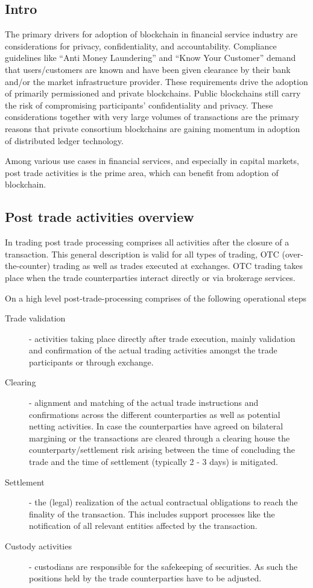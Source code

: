 \subsection{Intro}
The primary drivers for adoption of blockchain in financial service industry are considerations for privacy, confidentiality, and accountability. Compliance guidelines like “Anti Money Laundering” and “Know Your Customer” demand that users/customers are known and have been given clearance by their bank and/or the market infrastructure provider. These requirements drive the adoption of primarily permissioned and private blockchains. Public blockchains still carry the risk of compromising participants' confidentiality and privacy. These considerations together with very large volumes of transactions are the primary reasons that private consortium blockchains are gaining momentum in adoption of distributed ledger technology.

Among various use cases in financial services, and especially in capital markets, post trade activities is the prime area, which can benefit from adoption of blockchain.

\subsection{Post trade activities overview}
In trading post trade processing comprises all activities after the closure of a transaction. This general description is valid for all types of trading, OTC (over-the-counter) trading as well as trades executed at exchanges. OTC trading takes place when the trade counterparties interact directly or via brokerage services.

On a high level post-trade-processing comprises of the following operational steps
\begin{description}
\item [Trade validation] - activities taking place directly after trade execution, mainly validation and confirmation of the actual trading activities amongst the trade participants or through exchange. 
\item [Clearing] - alignment and  matching of the actual trade instructions and confirmations across the different counterparties as well as potential netting activities. In case the counterparties have agreed on bilateral margining or the transactions are cleared through a clearing house the counterparty/settlement risk arising between the time of concluding the trade and the time of settlement (typically 2 - 3 days) is mitigated. 
\item [Settlement] - the (legal) realization of the actual contractual obligations to reach the finality of the transaction. This includes support processes like the notification of all relevant entities affected by the transaction.
\item [Custody activities] - custodians are responsible for the safekeeping of securities. As such the positions held by the trade counterparties have to be adjusted. 
\end{description}

